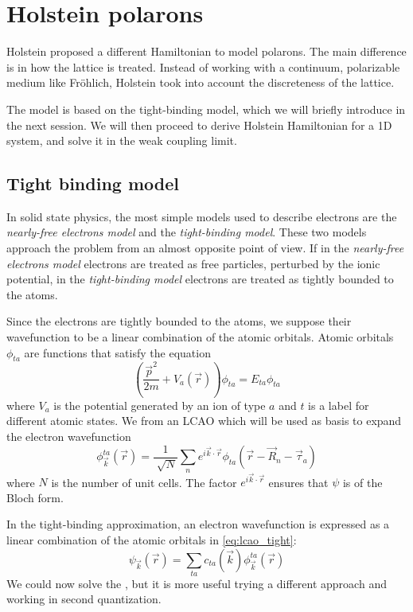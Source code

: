 \section{Holstein polarons}
Holstein proposed a different Hamiltonian to model polarons. The main difference is in how the lattice is treated. Instead of working with a continuum, polarizable medium like Fröhlich, Holstein took into account the discreteness of the lattice.

The model is based on the tight-binding model, which we will briefly introduce in the next session. We will then proceed to derive Holstein Hamiltonian for a 1D system, and solve it in the weak coupling limit.

\subsection{Tight binding model} \label{sec:tight-binding}
In solid state physics, the most simple models used to describe electrons are the \emph{nearly-free electrons model} and the \emph{tight-binding model}. These two models approach the problem from an almost opposite point of view. If in the \emph{nearly-free electrons model} electrons are treated as free particles, perturbed by the ionic potential, in the \emph{tight-binding model} electrons are treated as tightly bounded to the atoms.

Since the electrons are tightly bounded to the atoms, we suppose their wavefunction to be a linear combination of the atomic orbitals. Atomic orbitals $\phi_{ta}$ are functions that satisfy the equation
\begin{equation}
    \left(\frac{\vec{p}^2}{2m} + V_a(\vec{r}) \right) \phi_{ta} = E_{ta}\phi_{ta}
\end{equation}
where $V_a$ is the potential generated by an ion of type $a$ and $t$ is a label for different atomic states. We from an LCAO which will be used as basis to expand the electron wavefunction
\begin{equation} \label{eq:lcao_tight}
    \phi_\vec{k}^{ta}(\vec{r}) = \frac{1}{\sqrt[]{N}}\sum_{n} e^{i\vec{k}\cdot\vec{r}}\phi_{ta}(\vec{r}-\vec{R}_n - \vec{\tau}_a)
\end{equation}
where $N$ is the number of unit cells. The factor $e^{i\vec{k}\cdot\vec{r}}$ ensures that $\psi$ is of the Bloch form.

In the tight-binding approximation, an electron wavefunction is expressed as a linear combination of the atomic orbitals in \cref{eq:lcao_tight}:
\begin{equation} \label{eq:lcao}
    \psi_\vec{k}(\vec{r}) = \sum_{ta} c_{ta}(\vec{k}) \phi_\vec{k}^{ta}(\vec{r})
\end{equation}
We could now solve the \sche, but it is more useful trying a different approach and working in second quantization.

